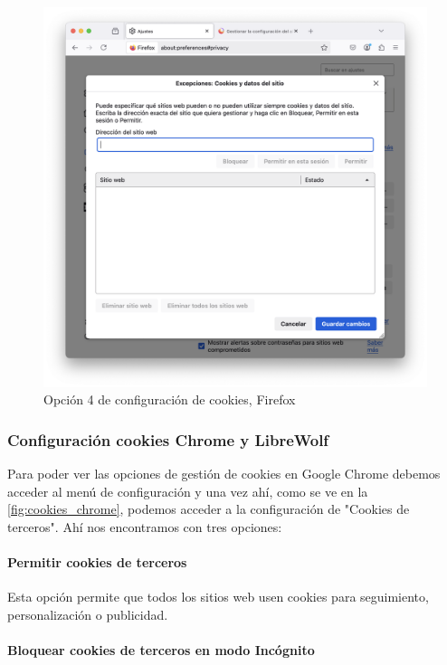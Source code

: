 \begin{figure}[H]   
    \centering
    \includegraphics[width=\textwidth]{opcion4_ej14.png}
    \caption{Opción 4 de configuración de cookies, Firefox}
    \label{fig:opcion4_ej14}
\end{figure}


\subsubsection{Configuración cookies Chrome y LibreWolf}

Para poder ver las opciones de gestión de cookies en Google Chrome debemos acceder al menú de configuración y una vez ahí, como se ve en la \ref{fig:cookies_chrome}, podemos acceder a la configuración de "Cookies de terceros". Ahí nos encontramos con tres opciones: 

\paragraph{Permitir cookies de terceros}

Esta opción permite que todos los sitios web usen cookies para seguimiento, personalización o publicidad. 

\paragraph{Bloquear cookies de terceros en modo Incógnito}

